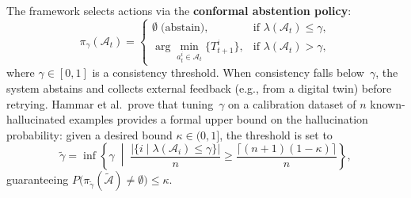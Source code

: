 %


The framework selects actions via the \textbf{conformal abstention
policy}:
\begin{equation}
\label{eq:abstention}
  \pi_\gamma(\mathcal{A}_t) =
  \begin{cases}
    \emptyset \;\text{(abstain)},
      & \text{if } \lambda(\mathcal{A}_t) \leq \gamma, \\[4pt]
    \displaystyle\arg\min_{a^i_t \in \mathcal{A}_t}\{T^i_{t+1}\},
      & \text{if } \lambda(\mathcal{A}_t) > \gamma,
  \end{cases}
\end{equation}
where $\gamma \in [0,1]$ is a consistency threshold.
When consistency falls below~$\gamma$, the system abstains and
collects external feedback (e.g., from a digital twin) before
retrying. Hammar et al.\ prove that tuning~$\gamma$ on a
calibration dataset of $n$ known-hallucinated examples provides a
formal upper bound on the hallucination probability: given a
desired bound $\kappa\in(0,1]$, the threshold is set to
\begin{equation}
\label{eq:gamma_calibration}
  \tilde{\gamma} = \inf\!\left\{
    \gamma \;\middle|\;
    \frac{|\{i \mid \lambda(\mathcal{A}_i)\leq\gamma\}|}{n}
    \geq
    \frac{\lceil(n+1)(1-\kappa)\rceil}{n}
  \right\},
\end{equation}
guaranteeing $P\!\bigl(\pi_{\tilde{\gamma}}(\tilde{\mathcal{A}})
\neq\emptyset\bigr)\leq\kappa$\;\cite{arXiv:2602.05279}.


%

